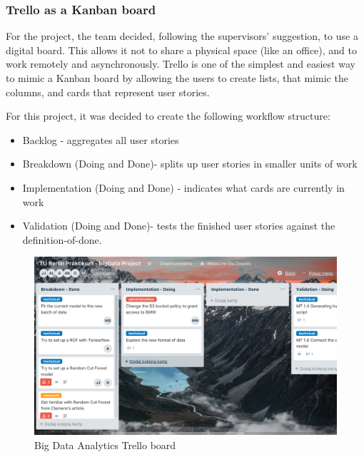                 \subsubsection{Trello as a Kanban board}
For the project, the team decided, following the supervisors’ suggestion, to use a digital board. This allows it not to share a physical space (like an office), and to work remotely and asynchronously. Trello is one of the simplest and easiest way to mimic a Kanban board by allowing the users to create lists, that mimic the columns, and cards that represent user stories.

For this project, it was decided to create the following workflow structure:
    \begin{itemize}
        \item Backlog - aggregates all user stories
        \item Breakdown (Doing and Done)- splits up user stories in smaller units of work
        \item Implementation (Doing and Done) - indicates what cards are currently in work
        \item Validation (Doing and Done)- tests the finished user stories against the definition-of-done.
    \end{itemize}

    \begin{figure}[h]
        \centering
        \includegraphics[width=1\textwidth]{images/trello.png}
        \caption{Big Data Analytics Trello board }
        \label{fig:trello_board_1}
    \end{figure}
    
